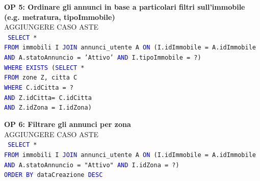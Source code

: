 \documentclass[a4paper,12pt]{report}
\begin{document}
            \noindent
            \textbf{OP 5: Ordinare gli annunci in base a particolari filtri sull'immobile (e.g. metratura, tipoImmobile)} \\
            AGGIUNGERE CASO ASTE \\
            \texttt{
                \textcolor{blue}{SELECT} * \\
                \textcolor{blue}{FROM} immobili I \textcolor{blue}{JOIN} annunci\_utente A \textcolor{blue}{ON} (I.idImmobile = A.idImmobile \textcolor{blue}{AND} A.statoAnnuncio = 'Attivo' \textcolor{blue}{AND} I.tipoImmobile = ?) \\
                \textcolor{blue}{WHERE} \textcolor{blue}{EXISTS} (\textcolor{blue}{SELECT} * \\
                    \null\qquad\qquad\qquad\quad\textcolor{blue}{FROM} zone Z, citta C \\
                    \null\qquad\qquad\qquad\quad\textcolor{blue}{WHERE} C.idCitta = ? \\
                    \null\qquad\qquad\qquad\quad\textcolor{blue}{AND} Z.idCitta= C.idCitta \\
                    \null\qquad\qquad\qquad\quad\textcolor{blue}{AND} Z.idZona = I.idZona) \\
            }

            \noindent
            \textbf{OP 6: Filtrare gli annunci per zona} \\
            AGGIUNGERE CASO ASTE \\
            \texttt{
                \textcolor{blue}{SELECT} * \\
                \textcolor{blue}{FROM} immobili I \textcolor{blue}{JOIN} annunci\_utente A \textcolor{blue}{ON} (I.idImmobile = A.idImmobile \\
                \textcolor{blue}{AND} A.statoAnnuncio = "Attivo" \textcolor{blue}{AND} I.idZona = ?) \\
                \textcolor{blue}{ORDER BY} dataCreazione   \textcolor{blue}{DESC} \\
            }
\end{document}

